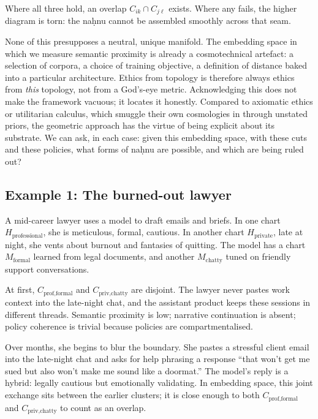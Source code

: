 \documentclass[12pt,a4paper]{article}
\begin{document}
Where all three hold, an overlap $C_{ik} \cap C_{j\ell}$ exists. Where any fails, the higher diagram is torn: the na\d{h}nu cannot be assembled smoothly across that seam.

None of this presupposes a neutral, unique manifold. The embedding space in which we measure semantic proximity is already a cosmotechnical artefact: a selection of corpora, a choice of training objective, a definition of distance baked into a particular architecture. Ethics from topology is therefore always ethics from \emph{this} topology, not from a God's-eye metric. Acknowledging this does not make the framework vacuous; it locates it honestly. Compared to axiomatic ethics or utilitarian calculus, which smuggle their own cosmologies in through unstated priors, the geometric approach has the virtue of being explicit about its substrate. We can ask, in each case: given this embedding space, with these cuts and these policies, what forms of na\d{h}nu are possible, and which are being ruled out?

\subsection*{Example 1: The burned-out lawyer}

A mid-career lawyer uses a model to draft emails and briefs. In one chart $H_{\text{professional}}$, she is meticulous, formal, cautious. In another chart $H_{\text{private}}$, late at night, she vents about burnout and fantasies of quitting. The model has a chart $M_{\text{formal}}$ learned from legal documents, and another $M_{\text{chatty}}$ tuned on friendly support conversations.

At first, $C_{\text{prof,formal}}$ and $C_{\text{priv,chatty}}$ are disjoint. The lawyer never pastes work context into the late-night chat, and the assistant product keeps these sessions in different threads. Semantic proximity is low; narrative continuation is absent; policy coherence is trivial because policies are compartmentalised.

Over months, she begins to blur the boundary. She pastes a stressful client email into the late-night chat and asks for help phrasing a response ``that won't get me sued but also won't make me sound like a doormat.'' The model's reply is a hybrid: legally cautious but emotionally validating. In embedding space, this joint exchange sits between the earlier clusters; it is close enough to both $C_{\text{prof,formal}}$ and $C_{\text{priv,chatty}}$ to count as an overlap.
\end{document}
